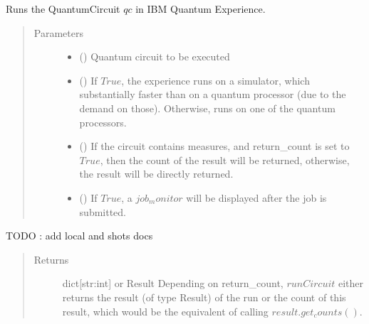 \documentclass[letterpaper,10pt,english]{sphinxmanual}
\begin{document}
\begin{fulllineitems}
\label{\detokenize{run:mermin_on_qiskit.run.runCircuit}}
Runs the QuantumCircuit \(qc\) in IBM Quantum Experience.
\begin{quote}\begin{description}
\item[{Parameters}] \leavevmode\begin{itemize}
\item {} 
 () \textendash{} Quantum circuit to be executed

\item {} 
 () \textendash{} If \(True\), the experience runs on a simulator, which 
substantially faster than on a quantum processor (due to the demand on
those). Otherwise, runs on one of the quantum processors.

\item {} 
 () \textendash{} If the circuit contains measures, and return\_count
is set to \(True\), then the count of the result will be returned, otherwise,
the result will be directly returned.

\item {} 
 () \textendash{} If \(True\), a \(job_monitor\) will be displayed after the
job is submitted.

\end{itemize}

\end{description}\end{quote}

TODO : add local and shots docs
\begin{quote}\begin{description}
\item[{Returns}] \leavevmode
dict{[}str:int{]} or Result \textendash{} Depending on return\_count, \(runCircuit\)
either returns the result (of type Result) of the run or the count of this
result, which would be the equivalent of calling \(result.get_counts()\).

\end{description}\end{quote}

\end{fulllineitems}
\end{document}
